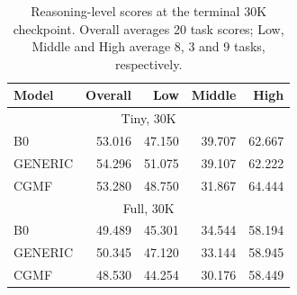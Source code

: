 \begin{table}[t]
\centering\small
\begin{tabular}{@{}lrrrr@{}}
\toprule
Model & Overall & Low & Middle & High \\
\midrule
\multicolumn{5}{c}{Tiny, 30K} \\
B0 & 53.016 & 47.150 & 39.707 & 62.667 \\
GENERIC & 54.296 & 51.075 & 39.107 & 62.222 \\
CGMF & 53.280 & 48.750 & 31.867 & 64.444 \\
\midrule
\multicolumn{5}{c}{Full, 30K} \\
B0 & 49.489 & 45.301 & 34.544 & 58.194 \\
GENERIC & 50.345 & 47.120 & 33.144 & 58.945 \\
CGMF & 48.530 & 44.254 & 30.176 & 58.449 \\
\bottomrule
\end{tabular}
\caption{Reasoning-level scores at the terminal 30K checkpoint. Overall averages 20 task scores; Low, Middle and High average 8, 3 and 9 tasks, respectively.}
\label{tab:levels}
\end{table}
